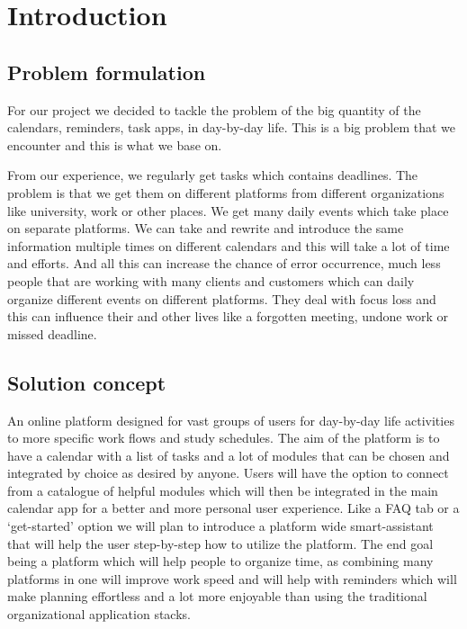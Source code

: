 	\section{Introduction}

\subsection{Problem formulation}
\par For our project we decided to tackle the problem of the big quantity of the calendars, reminders, task apps, in day-by-day life. This is a big problem that we encounter and this is what we base on. 

From our experience, we regularly get tasks which contains deadlines. The problem is that we get them on different platforms from different organizations like university, work or other places. We get many daily events which take place on separate platforms. We can take and rewrite and introduce the same information multiple times on different calendars and this will take a lot of time and efforts. And all this can increase the chance of error occurrence, much less people that are working with many clients and customers which can daily organize different events on different platforms. They deal with focus loss and this can influence their and other lives like a forgotten meeting, undone work or missed deadline.  

\subsection{Solution concept}
\par An online platform designed for vast groups of users for day-by-day life activities to more specific work flows and study schedules. The aim of the platform is to have a calendar with a list of tasks and a lot of modules that can be chosen and integrated by choice as desired by anyone. Users will have the option to connect from a catalogue of helpful modules which will then be integrated in the main calendar app for a better and more personal user experience. Like a FAQ tab or a ‘get-started’ option we will plan to introduce a platform wide smart-assistant that will help the user step-by-step how to utilize the platform. The end goal being a platform which will help people to organize time, as combining many platforms in one will improve work speed and will help with reminders which will make planning effortless and a lot more enjoyable than using the traditional organizational application stacks.  

